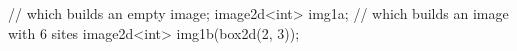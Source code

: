 // which builds an empty image;
image2d<int> img1a;
// which builds an image with 6 sites
image2d<int> img1b(box2d(2, 3));
